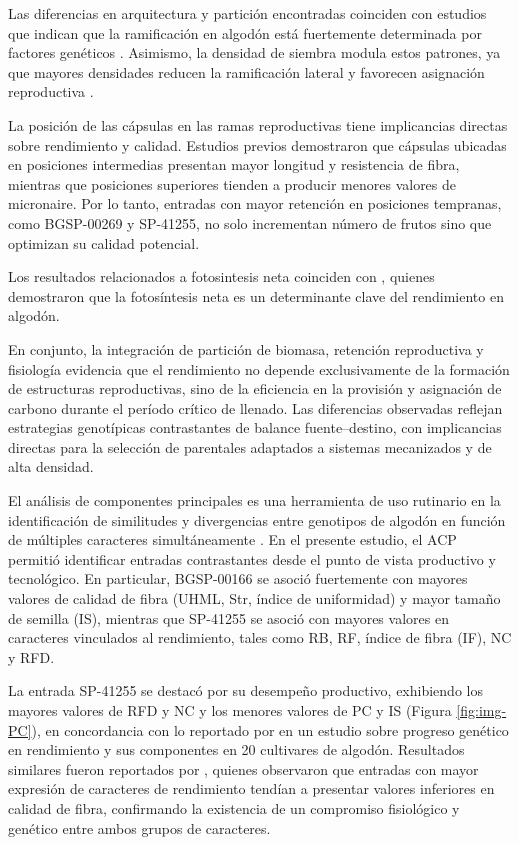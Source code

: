 \documentclass[12pt,oneside]{reedthesis}
\begin{document}
Las diferencias en arquitectura y partición encontradas coinciden con estudios que indican que la ramificación en algodón está fuertemente determinada por factores genéticos \autocite{mcgarry2016,sun2022,huang2022}. Asimismo, la densidad de siembra modula estos patrones, ya que mayores densidades reducen la ramificación lateral y favorecen asignación reproductiva \autocite{li2019a}.

La posición de las cápsulas en las ramas reproductivas tiene implicancias directas sobre rendimiento y calidad. Estudios previos \autocite{davidonis2004,nie2019,zhang2021} demostraron que cápsulas ubicadas en posiciones intermedias presentan mayor longitud y resistencia de fibra, mientras que posiciones superiores tienden a producir menores valores de micronaire. Por lo tanto, entradas con mayor retención en posiciones tempranas, como BGSP-00269 y SP-41255, no solo incrementan número de frutos sino que optimizan su calidad potencial.

Los resultados relacionados a fotosintesis neta coinciden con \textcite{li2019}, quienes demostraron que la fotosíntesis neta es un determinante clave del rendimiento en algodón.

En conjunto, la integración de partición de biomasa, retención reproductiva y fisiología evidencia que el rendimiento no depende exclusivamente de la formación de estructuras reproductivas, sino de la eficiencia en la provisión y asignación de carbono durante el período crítico de llenado. Las diferencias observadas reflejan estrategias genotípicas contrastantes de balance fuente--destino, con implicancias directas para la selección de parentales adaptados a sistemas mecanizados y de alta densidad.

El análisis de componentes principales es una herramienta de uso rutinario en la identificación de similitudes y divergencias entre genotipos de algodón en función de múltiples caracteres simultáneamente \autocite{shakeel2015,farooq2017,klein2022}. En el presente estudio, el ACP permitió identificar entradas contrastantes desde el punto de vista productivo y tecnológico. En particular, BGSP-00166 se asoció fuertemente con mayores valores de calidad de fibra (UHML, Str, índice de uniformidad) y mayor tamaño de semilla (IS), mientras que SP-41255 se asoció con mayores valores en caracteres vinculados al rendimiento, tales como RB, RF, índice de fibra (IF), NC y RFD.

La entrada SP-41255 se destacó por su desempeño productivo, exhibiendo los mayores valores de RFD y NC y los menores valores de PC y IS (Figura \ref{fig:img-PC}), en concordancia con lo reportado por \textcite{scarpin2022} en un estudio sobre progreso genético en rendimiento y sus componentes en 20 cultivares de algodón. Resultados similares fueron reportados por \textcite{mccarty2006}, quienes observaron que entradas con mayor expresión de caracteres de rendimiento tendían a presentar valores inferiores en calidad de fibra, confirmando la existencia de un compromiso fisiológico y genético entre ambos grupos de caracteres.
\end{document}
